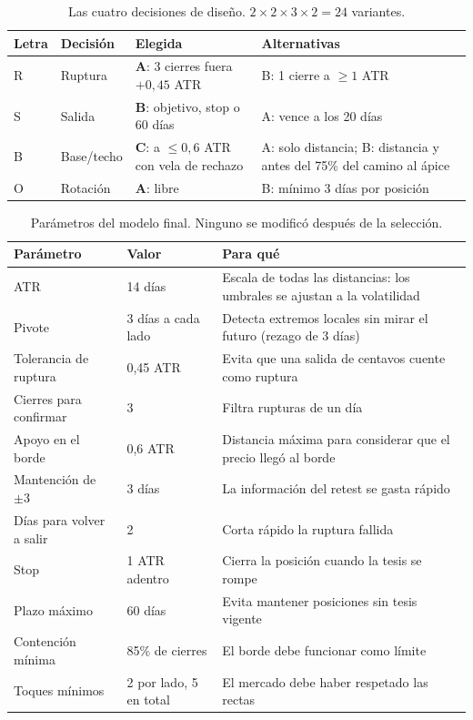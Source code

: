 \documentclass[10pt,a4paper]{article}
\begin{document}
\begin{table}[htbp]\centering\small
\begin{tabularx}{\textwidth}{@{}llXX@{}}
\toprule
Letra & Decisión & Elegida & Alternativas \\
\midrule
R & Ruptura & \textbf{A}: 3 cierres fuera $+0{,}45$ ATR & B: 1 cierre a $\geq1$ ATR \\
S & Salida & \textbf{B}: objetivo, stop o 60 días & A: vence a los 20 días \\
B & Base/techo & \textbf{C}: a $\leq0{,}6$ ATR con vela de rechazo & A: solo distancia; B: distancia y antes del 75\% del camino al ápice \\
O & Rotación & \textbf{A}: libre & B: mínimo 3 días por posición \\
\bottomrule
\end{tabularx}
\caption{Las cuatro decisiones de diseño. $2\times2\times3\times2=24$ variantes.}
\label{tab:variante}
\end{table}

\begin{table}[htbp]\centering\small
\begin{tabularx}{\textwidth}{@{}llX@{}}
\toprule
Parámetro & Valor & Para qué \\
\midrule
ATR & 14 días & Escala de todas las distancias: los umbrales se ajustan a la volatilidad \\
Pivote & 3 días a cada lado & Detecta extremos locales sin mirar el futuro (rezago de 3 días) \\
Tolerancia de ruptura & 0,45 ATR & Evita que una salida de centavos cuente como ruptura \\
Cierres para confirmar & 3 & Filtra rupturas de un día \\
Apoyo en el borde & 0,6 ATR & Distancia máxima para considerar que el precio llegó al borde \\
Mantención de $\pm3$ & 3 días & La información del retest se gasta rápido \\
Días para volver a salir & 2 & Corta rápido la ruptura fallida \\
Stop & 1 ATR adentro & Cierra la posición cuando la tesis se rompe \\
Plazo máximo & 60 días & Evita mantener posiciones sin tesis vigente \\
Contención mínima & 85\% de cierres & El borde debe funcionar como límite \\
Toques mínimos & 2 por lado, 5 en total & El mercado debe haber respetado las rectas \\
\bottomrule
\end{tabularx}
\caption{Parámetros del modelo final. Ninguno se modificó después de la selección.}\label{tab:param}
\end{table}
\end{document}
